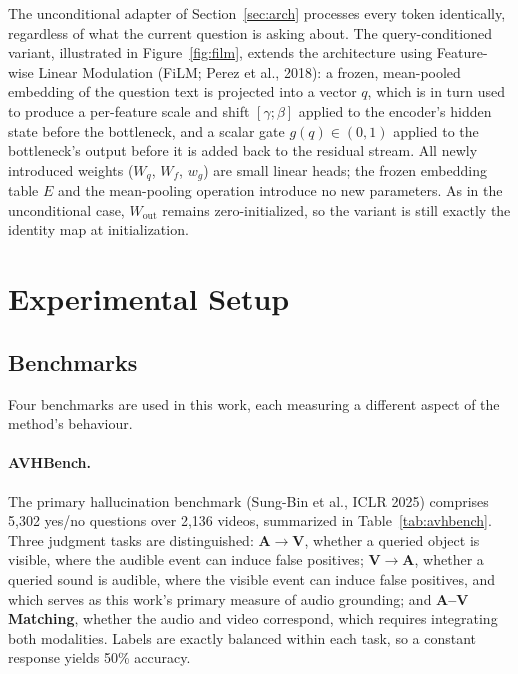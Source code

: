 \documentclass[11pt,a4paper,oneside]{article}
\begin{document}
The unconditional adapter of Section~\ref{sec:arch} processes every token identically, regardless of
what the current question is asking about. The query-conditioned variant, illustrated in
Figure~\ref{fig:film}, extends the architecture using Feature-wise Linear Modulation (FiLM; Perez et
al., 2018): a frozen, mean-pooled embedding of the question text is projected into a vector $q$,
which is in turn used to produce a per-feature scale and shift $[\gamma;\beta]$ applied to the
encoder's hidden state before the bottleneck, and a scalar gate $g(q)\in(0,1)$ applied to the
bottleneck's output before it is added back to the residual stream. All newly introduced weights
($W_q$, $W_f$, $w_g$) are small linear heads; the frozen embedding table $E$ and the mean-pooling
operation introduce no new parameters. As in the unconditional case, $W_{\text{out}}$ remains
zero-initialized, so the variant is still exactly the identity map at initialization.

\clearpage
\section{Experimental Setup}
\label{sec:setup}

\subsection{Benchmarks}
\label{sec:benchmarks}

Four benchmarks are used in this work, each measuring a different aspect of the method's behaviour.

\paragraph{AVHBench.} The primary hallucination benchmark (Sung-Bin et al., ICLR 2025) comprises
5,302 yes/no questions over 2,136 videos, summarized in Table~\ref{tab:avhbench}. Three judgment
tasks are distinguished: \textbf{A$\to$V}, whether a queried object is visible, where the audible
event can induce false positives; \textbf{V$\to$A}, whether a queried sound is audible, where the
visible event can induce false positives, and which serves as this work's primary measure of audio
grounding; and \textbf{A--V Matching}, whether the audio and video correspond, which requires
integrating both modalities. Labels are exactly balanced within each task, so a constant response
yields 50\% accuracy.
\end{document}
